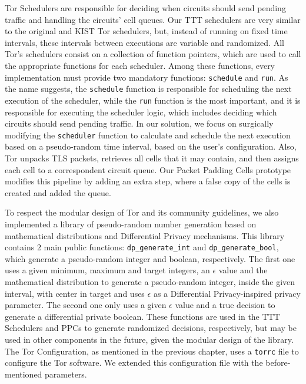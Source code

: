 Tor Schedulers are responsible for deciding when circuits should send pending traffic and handling the circuits' cell queues.  Our TTT schedulers are very similar to the original and KIST Tor schedulers, but, instead of running on fixed time intervals, these intervals between executions are variable and randomized. All Tor's schedulers consist on a collection of function pointers, which are used to call the appropriate functions for each scheduler. Among these functions, every implementation must provide two mandatory functions: \texttt{schedule} and \texttt{run}. As the name suggests, the \texttt{schedule} function is responsible for scheduling the next execution of the scheduler, while the \texttt{run} function is the most important, and it is responsible for executing the scheduler logic, which includes deciding which circuits should send pending traffic.
In our solution, we focus on surgically modifying the \texttt{scheduler} function to calculate and schedule the next execution based on a pseudo-random time interval, based on the user's configuration.  
Also, Tor unpacks TLS packets, retrieves all cells that it may contain, and then assigns each cell to a correspondent circuit queue. Our Packet Padding Cells prototype modifies this pipeline by adding an extra step, where a false copy of the cells is created and added the queue.

To respect the modular design of Tor and its community guidelines, we also implemented a library of pseudo-random number generation based on mathematical distributions and Differential Privacy mechanisms. This library contains 2 main public functions: \texttt{dp\_generate\_int} and \texttt{dp\_generate\_bool}, which generate a pseudo-random integer and boolean, respectively. The first one uses a given minimum, maximum and target integers, an $\epsilon$ value and the mathematical distribution to generate a pseudo-random integer, inside the given interval, with center in target and uses $\epsilon$ as a Differential Privacy-inspired privacy parameter. The second one only uses a given $\epsilon$ value and a true decision to generate a differential private boolean. These functions are used in the TTT Schedulers and PPCs to generate randomized decisions, respectively, but may be used in other components in the future, given the modular design of the library.
The Tor Configuration, as mentioned in the previous chapter, uses a \texttt{torrc} file to configure the Tor software. We extended this configuration file with the before-mentioned parameters.

